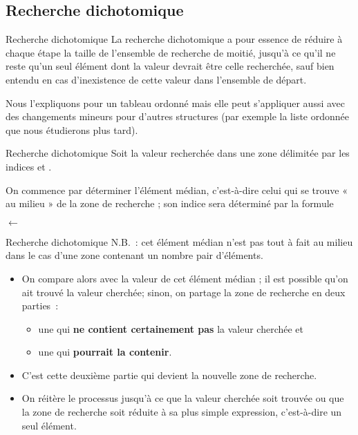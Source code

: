 \subsection{Recherche dichotomique}

\begin{frame}{Recherche dichotomique}
	La recherche dichotomique a pour essence de réduire à
	chaque étape la taille de l’ensemble de recherche de moitié, jusqu’à ce
	qu’il ne reste qu’un seul élément dont la valeur devrait être celle
	recherchée, sauf bien entendu en cas d’inexistence de cette valeur dans
	l’ensemble de départ. 
	
	\bigskip
	
	Nous l’expliquons pour un tableau ordonné mais
	elle peut s’appliquer aussi avec des changements mineurs pour
	d'autres structures (par exemple la liste ordonnée que
	nous étudierons plus tard).
\end{frame}

\begin{frame}{Recherche dichotomique}
	Soit  la valeur recherchée dans une zone
	délimitée par les indices  et
	. 
	
	\bigskip
	
	On commence par déterminer l’élément
	médian, c’est-à-dire celui qui se trouve « au milieu » de la zone de
	recherche ; son indice sera déterminé par la formule

	{\centering
	\textsf{$\leftarrow$}}
\end{frame}

\begin{frame}{Recherche dichotomique}
	N.B.~: cet élément médian n'est pas tout à fait au milieu dans 
	le cas d'une zone contenant un nombre pair d'éléments.
	\begin{itemize}
		\item
		On compare alors 
		avec la valeur de cet élément médian ; il est possible qu’on ait trouvé
		la valeur cherchée; sinon, on partage la zone de recherche en deux
		parties~: 
		\begin{itemize}
			\item
			une qui \textbf{ne contient certainement pas}
			la valeur cherchée et 
			\item
			une qui \textbf{pourrait la
			contenir}. 
		\end{itemize}
		\item
		C’est cette deuxième partie qui 
		devient la nouvelle zone de recherche. 
		\item
		On réitère le processus jusqu’à ce que la valeur cherchée soit trouvée ou
		que la zone de recherche soit réduite à sa plus simple expression,
		c’est-à-dire un seul élément.
	\end{itemize}
\end{frame}

